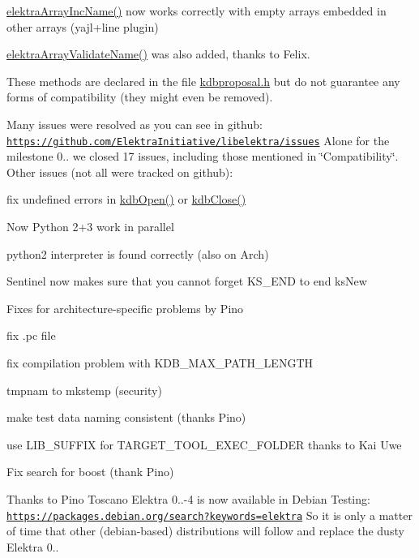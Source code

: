 {\ttfamily \hyperlink{array_8c_afc46476b8d722d89e07a966e023df317}{elektra\+Array\+Inc\+Name()}} now works correctly with empty arrays embedded in other arrays (yajl+line plugin)

{\ttfamily \hyperlink{array_8c_ac97baa33fb7b7e83192e156827ba2eb5}{elektra\+Array\+Validate\+Name()}} was also added, thanks to Felix.

These methods are declared in the file {\ttfamily \hyperlink{kdbproposal_8h}{kdbproposal.\+h}} but do not guarantee any forms of compatibility (they might even be removed).

Many issues were resolved as you can see in github\+: \href{https://github.com/ElektraInitiative/libelektra/issues}{\tt https\+://github.\+com/\+Elektra\+Initiative/libelektra/issues} Alone for the milestone 0.. we closed 17 issues, including those mentioned in \char`\"{}\+Compatibility\char`\"{}. Other issues (not all were tracked on github)\+:


\begin{DoxyItemize}
\item fix undefined errors in {\ttfamily \hyperlink{group__kdb_ga6808defe5870f328dd17910aacbdc6ca}{kdb\+Open()}} or {\ttfamily \hyperlink{group__kdb_gadb54dc9fda17ee07deb9444df745c96f}{kdb\+Close()}}
\item Now Python 2+3 work in parallel
\item python2 interpreter is found correctly (also on Arch)
\item Sentinel now makes sure that you cannot forget {\ttfamily K\+S\+\_\+\+E\+ND} to end {\ttfamily ks\+New}
\item Fixes for architecture-\/specific problems by Pino
\item fix .pc file
\item fix compilation problem with {\ttfamily K\+D\+B\+\_\+\+M\+A\+X\+\_\+\+P\+A\+T\+H\+\_\+\+L\+E\+N\+G\+TH}
\item tmpnam to mkstemp (security)
\item make test data naming consistent (thanks Pino)
\item use {\ttfamily L\+I\+B\+\_\+\+S\+U\+F\+F\+IX for T\+A\+R\+G\+E\+T\+\_\+\+T\+O\+O\+L\+\_\+\+E\+X\+E\+C\+\_\+\+F\+O\+L\+D\+ER} thanks to Kai Uwe
\item Fix search for boost (thank Pino)
\end{DoxyItemize}

Thanks to Pino Toscano Elektra 0..-\/4 is now available in Debian Testing\+: \href{https://packages.debian.org/search?keywords=elektra}{\tt https\+://packages.\+debian.\+org/search?keywords=elektra} So it is only a matter of time that other (debian-\/based) distributions will follow and replace the dusty Elektra 0..

